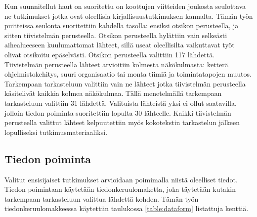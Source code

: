 Kun suunnitellut haut on suoritettu on koottujen viitteiden joukosta seulottava
ne tutkimukset jotka ovat oleellisia kirjallisuustutkimuksen kannalta. Tämän
työn puitteissa seulonta suoritettiin kahdella tasolla: ensiksi otsikon
perusteella, ja sitten tiivistelmän perusteella. Otsikon perusteella hylättiin
vain selkeästi aihealueeseen kuulumattomat lähteet, sillä useat oleellisilta
vaikuttavat työt olivat otsikoitu epäselvästi. Otsikon perusteella valittiin 117
lähdettä. Tiivistelmän perusteella lähteet arvioitiin kolmesta näkökulmasta:
ketterä ohjelmistokehitys, suuri organisaatio tai monta tiimiä ja
toimintatapojen muutos. Tarkempaan tarkasteluun valittiin vain ne lähteet jotka
tiivistelmän perusteella käsitelivät kaikkia kolmea näkökulmaa. Tällä
menetelmällä tarkempaan tarkasteluun valittiin 31 lähdettä. Valituista lähteistä
yksi ei ollut saatavilla, jolloin tiedon poiminta suoritettiin lopulta 30
lähteelle. Kaikki tiivistelmän perusteella valittut lähteet kelpuutettiin
myös kokotekstin tarkastelun jälkeen lopulliseksi tutkimusmateriaaliksi.

\subsection{Tiedon poiminta}

Valitut ensisijaiset tutkimukset arvioidaan poimimalla niistä oleelliset tiedot.
Tiedon poimintaan käytetään tiedonkeruulomaketta, joka täytetään kutakin
tarkempaan tarkasteluun valittua lähdettä kohden. Tämän työn
tiedonkeruulomakkeessa käytettiin taulukossa \ref{table:dataform} listattuja
kenttiä.

